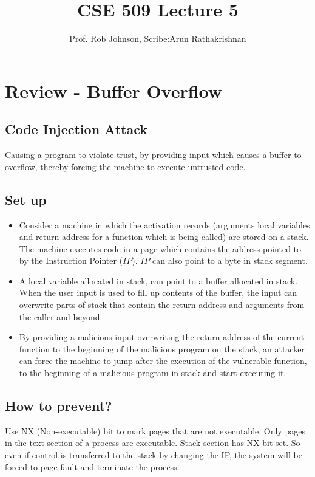 \documentclass[11pt]{article} %
\title{CSE 509 Lecture 5}
\author{Prof. Rob Johnson, Scribe:Arun Rathakrishnan}
\begin{document}
\maketitle

\section{Review - Buffer Overflow}
\subsection{Code Injection Attack}
Causing a program to violate trust, by providing input which causes a buffer to
overflow, thereby forcing the machine to execute untrusted code.

\subsection{Set up}
\begin {itemize} \itemsep -2pt
\item Consider a machine in which the activation records (arguments local
variables and return address for a function which is being called) are stored on
a stack. The machine executes code in a page which contains the address pointed
to by the Instruction Pointer ($IP$). $IP$ can also point to a byte in stack segment.
\item A local variable allocated in stack, can point to a buffer allocated in stack.
When the user input is used to fill up contents of the buffer, the input can overwrite
parts of stack that contain the return address and arguments from the caller and beyond.
\item By providing a malicious input overwriting the return address
of the current function to the beginning of the malicious program on the stack,
an attacker can force the machine to jump after the execution of the vulnerable 
function, to the beginning of a malicious program in stack and start executing it.
\end {itemize}

\subsection{How to prevent?}
Use NX (Non-executable) bit to mark pages that are not executable. Only pages
in the text section of a process are executable. Stack section has NX bit set.
So even if control is transferred to the stack by changing the IP, the system
will be forced to page fault and terminate the process.
\end{document}
